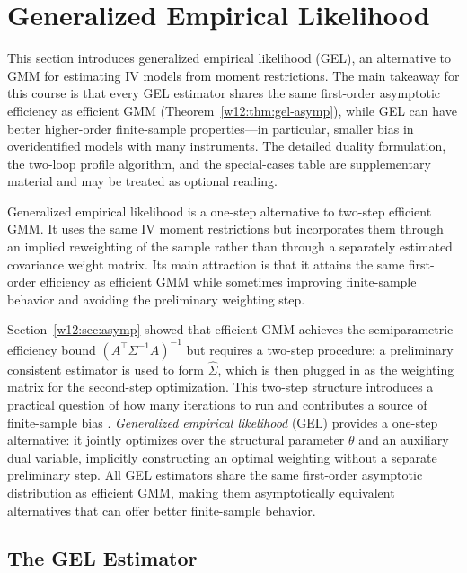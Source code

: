 \documentclass[master.tex]{subfiles}
\begin{document}
\section{Generalized Empirical Likelihood}
\label{w12:sec:gel}

\begin{remark}
This section introduces generalized empirical likelihood (GEL), an
alternative to GMM for estimating IV models from moment restrictions.
The main takeaway for this course is that every GEL estimator shares
the same first-order asymptotic efficiency as efficient GMM
(Theorem~\ref{w12:thm:gel-asymp}), while GEL can have better
higher-order finite-sample properties---in particular, smaller bias
in overidentified models with many instruments.  The detailed
duality formulation, the two-loop profile algorithm, and the
special-cases table are supplementary material and may be treated
as optional reading.
\end{remark}

Generalized empirical likelihood is a one-step alternative to
two-step efficient GMM.  It uses the same IV moment restrictions
but incorporates them through an implied reweighting of the sample
rather than through a separately estimated covariance weight matrix.
Its main attraction is that it attains the same first-order
efficiency as efficient GMM while sometimes improving finite-sample
behavior and avoiding the preliminary weighting step.

Section~\ref{w12:sec:asymp} showed that efficient GMM achieves the
semiparametric efficiency bound $(A^\top\Sigma^{-1}A)^{-1}$ but
requires a two-step procedure: a preliminary consistent estimator
is used to form $\hat\Sigma$, which is then plugged in as the
weighting matrix for the second-step optimization.  This two-step
structure introduces a practical question of how many iterations to
run and contributes a source of finite-sample bias
\citep{neweysmith2004}.  \emph{Generalized empirical likelihood} (GEL)
provides a one-step alternative: it jointly optimizes over the
structural parameter $\theta$ and an auxiliary dual variable,
implicitly constructing an optimal weighting without a separate
preliminary step.  All GEL estimators share the same first-order
asymptotic distribution as efficient GMM, making them
asymptotically equivalent alternatives that can offer better
finite-sample behavior.

\subsection{The GEL Estimator}
\label{w12:sec:gel:def}
\end{document}

